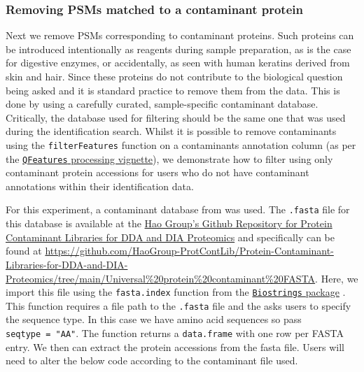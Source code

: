 \documentclass[9pt,a4paper,]{extarticle}
\begin{document}
\subsubsection{Removing PSMs matched to a contaminant protein}\label{removing-psms-matched-to-a-contaminant-protein}

Next we remove PSMs corresponding to contaminant proteins. Such proteins can be
introduced intentionally as reagents during sample preparation, as is the case
for digestive enzymes, or accidentally, as seen with human keratins derived from
skin and hair. Since these proteins do not contribute to the biological question
being asked and it is standard practice to remove them from the data. This is
done by using a carefully curated, sample-specific contaminant database.
Critically, the database used for filtering should be the same one that was used
during the identification search. Whilst it is possible to remove contaminants
using the \texttt{filterFeatures} function on a contaminants annotation column (as per
the \href{https://bioconductor.org/packages/release/bioc/vignettes/QFeatures/inst/doc/Processing.html}{\texttt{QFeatures} processing vignette}),
we demonstrate how to filter using only contaminant protein accessions for users
who do not have contaminant annotations within their identification data.

For this experiment, a contaminant database from \citep{Frankenfield2022} was used.
The \texttt{.fasta} file for this database is available at the \href{Protein\%20Contaminant\%20Libraries\%20for\%20DDA\%20and\%20DIA\%20Proteomics}{Hao Group's Github Repository for Protein Contaminant Libraries for DDA and DIA Proteomics}
and specifically can be found at \url{https://github.com/HaoGroup-ProtContLib/Protein-Contaminant-Libraries-for-DDA-and-DIA-Proteomics/tree/main/Universal\%20protein\%20contaminant\%20FASTA}.
Here, we import this file using the \texttt{fasta.index} function from the
\href{https://bioconductor.org/packages/release/bioc/html/Biostrings.html}{\texttt{Biostrings} package}
\citep{biostrings}. This function requires a file path to the \texttt{.fasta} file and the
asks users to specify the sequence type. In this case we have amino acid
sequences so pass \texttt{seqtype\ =\ "AA"}. The function returns a \texttt{data.frame} with one
row per FASTA entry. We then can extract the protein accessions from the fasta
file. Users will need to alter the below code according to the contaminant file
used.
\end{document}
